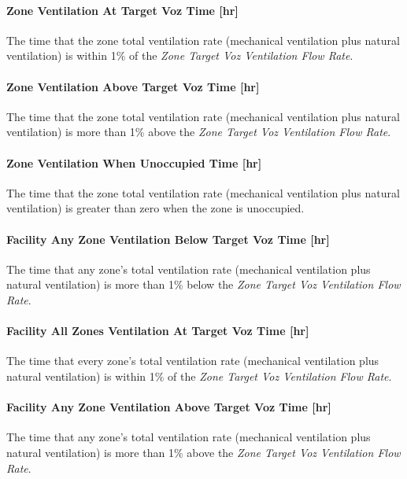 \paragraph{Zone Ventilation At Target Voz Time {[}hr{]}}\label{zone-ventilation-at-target-voz-time}
The time that the zone total ventilation rate (mechanical ventilation plus natural ventilation) is within 1\% of the \emph{Zone Target Voz Ventilation Flow Rate}.

\paragraph{Zone Ventilation Above Target Voz Time {[}hr{]}}\label{zone-ventilation-above-target-voz-time}
The time that the zone total ventilation rate (mechanical ventilation plus natural ventilation) is more than 1\% above the \emph{Zone Target Voz Ventilation Flow Rate}.

\paragraph{Zone Ventilation When Unoccupied Time {[}hr{]}}\label{zone-ventilation-when-unoccupied-time}
The time that the zone total ventilation rate (mechanical ventilation plus natural ventilation) is greater than zero when the zone is unoccupied.

\paragraph{Facility Any Zone Ventilation Below Target Voz Time {[}hr{]}}\label{facility-any-zone-ventilation-below-target-voz-time}
The time that any zone's total ventilation rate (mechanical ventilation plus natural ventilation) is more than 1\% below the \emph{Zone Target Voz Ventilation Flow Rate}.

\paragraph{Facility All Zones Ventilation At Target Voz Time {[}hr{]}}\label{facility-all-zones-ventilation-at-target-voz-time}
The time that every zone's total ventilation rate (mechanical ventilation plus natural ventilation) is within 1\% of the \emph{Zone Target Voz Ventilation Flow Rate}.

\paragraph{Facility Any Zone Ventilation Above Target Voz Time {[}hr{]}}\label{facility-any-zone-ventilation-above-target-voz-time}
The time that any zone's total ventilation rate (mechanical ventilation plus natural ventilation) is more than 1\% above the \emph{Zone Target Voz Ventilation Flow Rate}.

